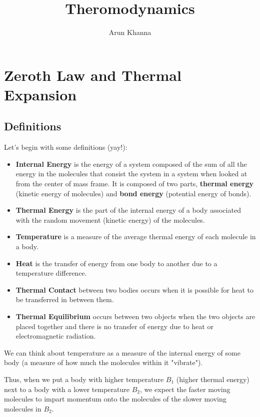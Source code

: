 \documentclass{report}
\title{Theromodynamics}
\author{Arun Khanna}
\date{}
\begin{document}
\maketitle
\tableofcontents

\newpage

\chapter{Zeroth Law and Thermal Expansion}
\section{Definitions}

Let's begin with some definitions (yay!):

\begin{itemize}
	\item \textbf{Internal Energy} is the energy of a system composed of the sum of all the energy in the molecules that consist the system in a system when looked at from the center of mass frame. It is composed of two parts, \textbf{thermal energy} (kinetic energy of molecules) and \textbf{bond energy} (potential energy of bonds).
	\item \textbf{Thermal Energy} is the part of the internal energy of a body associated with the random movement (kinetic energy) of the molecules.
	\item \textbf{Temperature} is a measure of the average thermal energy of each molecule in a body.
	\item \textbf{Heat} is the transfer of energy from one body to another due to a temperature difference.
	\item \textbf{Thermal Contact} between two bodies occurs when it is possible for heat to be transferred in between them.
	\item \textbf{Thermal Equilibrium} occurs between two objects when the two objects are placed together and there is no transfer of energy due to heat or electromagnetic radiation.
	
\end{itemize}

We can think about temperature as a measure of the internal energy of some body (a measure of how much the molecules within it "vibrate").

Thus, when we put a body with higher temperature $B_1$ (higher thermal energy) next to a body with a lower temperature $B_2$, we expect the faster moving molecules
to impart momentum onto the molecules of the slower moving molecules in $B_2$. 
\end{document}
